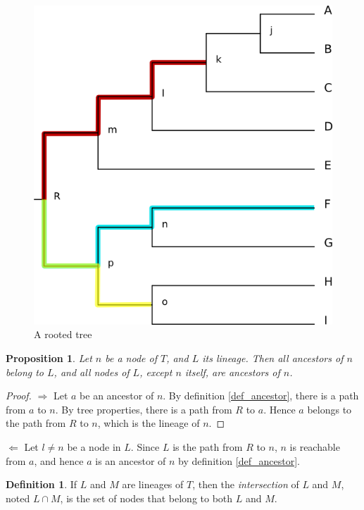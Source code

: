 \documentclass[a4paper,10pt]{report}
\newtheorem{prop}{Proposition}
\theoremstyle{definition}
\newtheorem{dfn}{Definition}
\begin{document}
{\begin{figure}[b]
 \centering
 \includegraphics{prop_tree.png}
  \caption{A rooted tree}
 \label{fig_app_tree_prop}
\end{figure}

\begin{prop}
\label{prop_lineage_ancestors_equivalence}
Let $n$ be a node of $T$, and $L$ its lineage. Then all ancestors of $n$ belong to $L$, and all nodes of $L$, except $n$ itself, are ancestors of $n$.
\end{prop}

\begin{proof}

$\Rightarrow$ Let $a$ be an ancestor of $n$. By definition \ref{def_ancestor}, there is a path from $a$ to $n$. By tree properties, there is a path from $R$ to $a$. Hence $a$ belongs to the path from $R$ to $n$, which is the lineage of $n$.
\end{proof}

\noindent{}$\Leftarrow$ Let $l \neq n$ be a node in $L$. Since $L$ is the path from $R$ to $n$, $n$ is reachable from $a$, and hence $a$ is an ancestor of $n$ by definition \ref{def_ancestor}.

\begin{dfn}
If $L$ and $M$ are lineages of $T$, then the \textit{intersection}
of $L$ and $M$, noted $L \cap M$, is the set of nodes that belong to both $L$ and $M$.
\end{dfn} 

}
\end{document}
